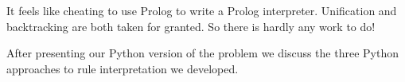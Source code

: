 It feels like cheating to use Prolog to write a Prolog interpreter. Unification and backtracking are both taken for granted. So there is hardly any work to do! 
\smallv

After presenting our Python version of the problem we discuss the three Python approaches to rule interpretation we developed.
\smallv






